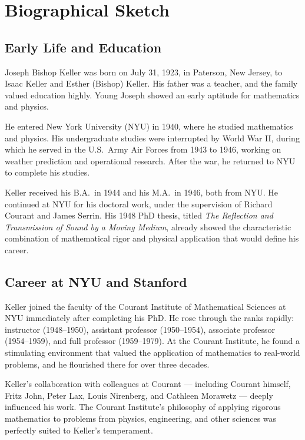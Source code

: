 \section{Biographical Sketch}

\subsection{Early Life and Education}

Joseph Bishop Keller was born on July 31, 1923, in Paterson, New Jersey, to Isaac Keller and Esther (Bishop) Keller. His father was a teacher, and the family valued education highly. Young Joseph showed an early aptitude for mathematics and physics.

He entered New York University (NYU) in 1940, where he studied mathematics and physics. His undergraduate studies were interrupted by World War II, during which he served in the U.S.\ Army Air Forces from 1943 to 1946, working on weather prediction and operational research. After the war, he returned to NYU to complete his studies.

Keller received his B.A.\ in 1944 and his M.A.\ in 1946, both from NYU. He continued at NYU for his doctoral work, under the supervision of Richard Courant and James Serrin. His 1948 PhD thesis, titled \textit{The Reflection and Transmission of Sound by a Moving Medium}, already showed the characteristic combination of mathematical rigor and physical application that would define his career.

\subsection{Career at NYU and Stanford}

Keller joined the faculty of the Courant Institute of Mathematical Sciences at NYU immediately after completing his PhD. He rose through the ranks rapidly: instructor (1948--1950), assistant professor (1950--1954), associate professor (1954--1959), and full professor (1959--1979). At the Courant Institute, he found a stimulating environment that valued the application of mathematics to real-world problems, and he flourished there for over three decades.

Keller's collaboration with colleagues at Courant --- including Courant himself, Fritz John, Peter Lax, Louis Nirenberg, and Cathleen Morawetz --- deeply influenced his work. The Courant Institute's philosophy of applying rigorous mathematics to problems from physics, engineering, and other sciences was perfectly suited to Keller's temperament.

